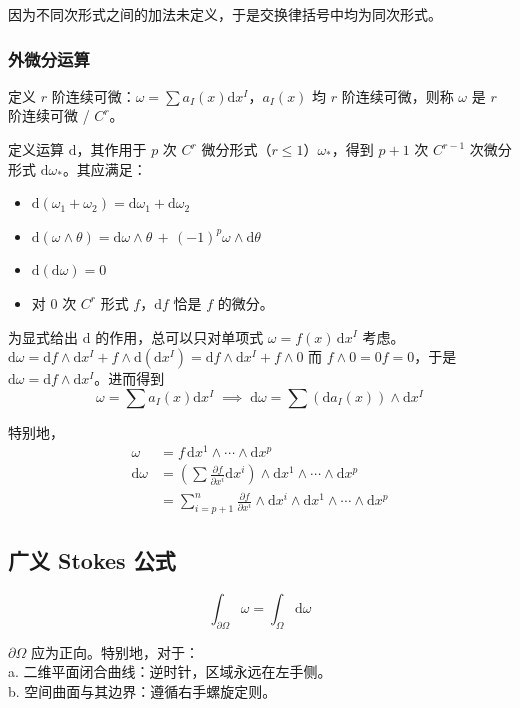 \documentclass[12pt, a4paper, UTF8, openany]{ctexbook}
\newcommand{\dif}{\mathrm{d}}
\newcommand{\sdif}{\,\dif}
\begin{document}
        因为不同次形式之间的加法未定义，于是交换律括号中均为同次形式。

        \subsubsection{外微分运算}
        定义 $r$ 阶连续可微：$\omega = \sum a_I(x) \dif x^I$，$a_I(x)$ 均 $r$ 阶连续可微，则称 $\omega$ 是 $r$ 阶连续可微 / $C^r$。

        定义运算 $\dif$，其作用于 $p$ 次 $C^r$ 微分形式（$r \leqslant 1$）$\omega_\ast$，得到 $p + 1$ 次 $C^{r - 1}$ 次微分形式 $\dif \omega_\ast$。其应满足：
        \begin{itemize}
            \item $\dif(\omega_1 + \omega_2) = \dif \omega_1 + \dif \omega_2$
            \item $\dif(\omega \land \theta) = \dif \omega \land \theta \,+\, (-1)^p \omega \land \dif \theta$
            \item $\dif(\dif \omega) = 0$
            \item 对 $0$ 次 $C^r$ 形式 $f$，$\dif f$ 恰是 $f$ 的微分。
        \end{itemize}

        为显式给出 $\dif$ 的作用，总可以只对单项式 $\omega = f(x) \sdif x^I$ 考虑。
        $\dif \omega = \dif f \land \dif x^I + f \land \boxed{\dif(\dif x^I)} = \dif f \land \dif x^I + f \land 0$
        而 $f \land 0 = 0 f = 0$，于是 $\dif \omega = \dif f \land \dif x^I$。进而得到
        $$\omega = \sum a_I(x) \dif x^I \; \implies \; \dif \omega = \sum (\dif a_I(x)) \land \dif x^I$$

        特别地，
        $$\begin{aligned}
            \omega &= f \sdif x^1 \land \cdots \land \dif x^p \\
            \dif \omega &= (\sum \frac{\partial f}{\partial x^i} \dif x^i) \land \dif x^1 \land \cdots \land \dif x^p \\
            &= \sum_{i = p + 1}^{n} \frac{\partial f}{\partial x^i} \land \dif x^i \land \dif x^1 \land \cdots \land \dif x^p
        \end{aligned}$$

        \subsection{广义 Stokes 公式}
        $$\int_{\partial \Omega} \omega = \int_{\Omega} \dif \omega$$

        $\partial \Omega$ 应为{\heiti 正向}。特别地，对于：\\
        a. 二维平面闭合曲线：{\heiti 逆}时针，区域永远在{\heiti 左手侧}。\\
        b. 空间曲面与其边界：遵循{\heiti 右手螺旋定则}。
        
\end{document}
